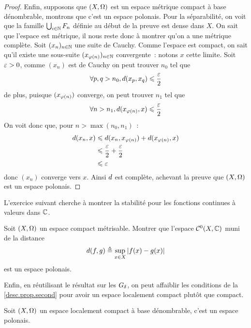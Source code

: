 \begin{proof}
  Enfin, supposons que $(X,\Omega)$ est un espace métrique compact à base
  dénombrable, montrons que c'est un espace polonais. Pour la séparabilité,
  on voit que la famille $\bigcup_{i \in \mathbb N} F_n$ définie au début de la
  preuve est dense dans $X$. On sait que l'espace est métrique, il nous reste
  donc à montrer qu'on a une métrique complète. Soit $(x_n)_{n\in\mathbb N}$
  une suite de Cauchy. Comme l'espace est compact, on sait qu'il existe une
  sous-suite $(x_{\varphi(n)})_{n\in\mathbb N}$ convergente~: notons $x$ cette limite.
  Soit $\varepsilon > 0$, comme $(x_n)$ est de Cauchy on peut trouver $n_0$ tel que
  \[\forall p,q > n_0, d(x_p,x_q) \leqslant \frac{\varepsilon}{2}\]
  de plus, puisque $(x_{\varphi(n)})$ converge, on peut trouver $n_1$ tel que
  \[\forall n > n_1, d(x_{\varphi(n)},x) \leqslant \frac{\varepsilon}{2}\]
  On voit donc que, pour $n > \max(n_0,n_1)$~:
  \begin{align*}
    d(x_n,x)
    &\leqslant d(x_n,x_{\varphi(n)}) + d(x_{\varphi(n)},x)\\
    &\leqslant \frac{\varepsilon}{2} + \frac{\varepsilon}{2}\\
    &\leqslant\varepsilon
  \end{align*}
  donc $(x_n)$ converge vers $x$. Ainsi $d$ est complète, achevant la
  preuve que $(X,\Omega)$ est un espace polonais.
\end{proof}

L'exercice suivant cherche à montrer la stabilité pour les fonctions continues à
valeurs dans $\mathbb C$.

\begin{exercise}
  Soit $(X,\Omega)$ un espace compact métrisable. Montrer que l'espace
  $\mathcal C^0(X,\mathbb C)$ muni de la distance
  \[d(f,g) \triangleq \sup_{x \in X}|f(x) - g(x)|\]
  est un espace polonais.
\end{exercise}

Enfin, en réutilisant le résultat sur les $G_{\delta}$, on peut affaiblir les
conditions de la \cref{desc.prop.second} pour avoir un espace localement
compact plutôt que compact.

\begin{proposition}
  Soit $(X,\Omega)$ un espace localement compact à base dénombrable, c'est un
  espace polonais.
\end{proposition}

